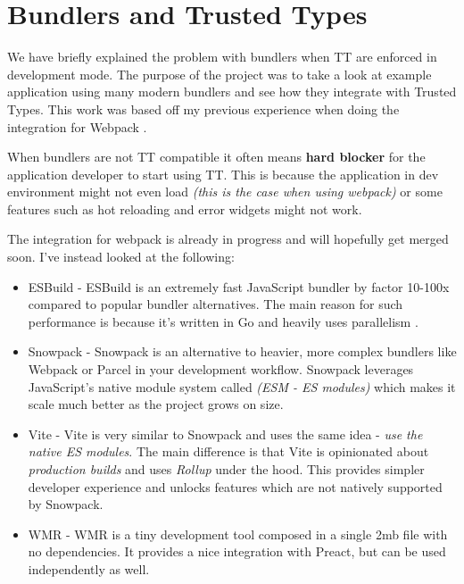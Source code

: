 \chapter{Bundlers and Trusted Types}

\label{chapter:bundlers} %

We have briefly explained the problem with bundlers when TT are enforced in development mode. The
purpose of the project was to take a look at example application using many modern bundlers and see
how they integrate with Trusted Types. This work was based off my previous experience when doing the
integration for Webpack \cite{webpack_tt_integration}.

When bundlers are not TT compatible it often means \textbf{hard blocker} for the application
developer to start using TT. This is because the application in dev environment might not even load
\emph{(this is the case when using webpack)} or some features such as hot reloading and error
widgets might not work.

The integration for webpack is already in progress and will hopefully get merged soon. I've instead looked at the following:

\begin{itemize}
  \item  ESBuild \cite{esbuild_web} - ESBuild is an extremely fast JavaScript bundler by factor
        10-100x compared to popular bundler alternatives. The main reason for such performance is
        because it's written in Go and heavily uses parallelism \cite{esbuild_fast}.
  \item  Snowpack \cite{snowpack_web} - Snowpack is an alternative to heavier, more complex bundlers
        like Webpack or Parcel in your development workflow. Snowpack leverages JavaScript's native
        module system called \emph{(ESM - ES modules)} which makes it scale much better as the
        project grows on size.
  \item  Vite \cite{vite_web} - Vite is very similar to Snowpack and uses the same idea - \emph{use
          the native ES modules}. The main difference is that Vite is opinionated about
        \emph{production builds} and uses \emph{Rollup} under the hood. This provides simpler
        developer experience and unlocks features which are not natively supported by Snowpack.
  \item  WMR \cite{wmr_web} - WMR is a tiny development tool composed in a single 2mb file with no
        dependencies. It provides a nice integration with Preact, but can be used independently as
        well.
\end{itemize}


